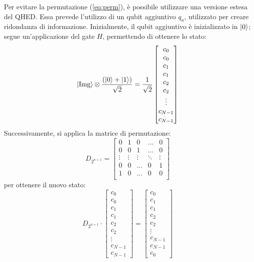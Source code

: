 Per evitare la permutazione (\ref{eq:perm}), è possibile utilizzare una
versione estesa del QHED. Essa prevede l'utilizzo di un qubit aggiuntivo $q_a$,
utilizzato per creare ridondanza di informazione. Inizialmente, il qubit
aggiuntivo è inizializzato in $\lvert0\rangle$; segue un'applicazione del gate $H$,
permettendo di ottenere lo stato:
\begin{equation}
	\lvert\text{Img}\rangle \otimes 
		\frac{(\lvert0\rangle + \lvert1\rangle)}{\sqrt 2} =
		\frac{1}{\sqrt 2} \begin{bmatrix}
			c_0\\c_0\\c_1\\c_1\\c_2\\c_2\\\vdots\\c_{N-1}\\c_{N-1}
		\end{bmatrix}
\end{equation}
Successivamente, si applica la matrice di permutazione:
\begin{equation}
	D_{2^{n+1}} = \begin{bmatrix}
		0 & 1 & 0 &\ldots& 0 \\
		0 & 0 & 1 &\ldots& 0 \\
		\vdots & \vdots & \vdots & \ddots & \vdots \\
		0 & 0 &\ldots & 0 & 1\\
		1 & 0 &\ldots & 0 & 0\\
	\end{bmatrix}
	\label{eq:eq-perm-matrix}
\end{equation}
per ottenere il nuovo stato:
\begin{equation}
	D_{2^{n+1}} \cdot \begin{bmatrix}
		c_0\\c_0\\c_1\\c_1\\c_2\\c_2\\\vdots\\c_{N-1}\\c_{N-1}
	\end{bmatrix} = \begin{bmatrix}
		c_0\\c_1\\c_1\\c_2\\c_2\\\vdots\\c_{N-1}\\c_{N-1}\\c_0
	\end{bmatrix}
	\label{eq:perm-state}
\end{equation}
